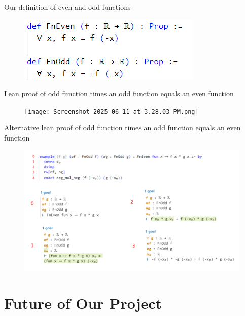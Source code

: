\documentclass[xcolor=dvipsnames]{beamer}
\begin{document}
\begin{frame}{Our definition of even and odd functions}
\begin{figure}
    \centering
    \includegraphics[scale=1]{ev_odd_def.png}
\end{figure}
\end{frame}

\begin{frame}{Lean proof of odd function times an odd function equals an even function}

\begin{figure}
    \centering
    \texttt{[image: Screenshot 2025-06-11 at 3.28.03 PM.png]}
\end{figure}

\end{frame}

\begin{frame}{Alternative lean proof of odd function times an odd function equals an even function}

\begin{figure}
\includegraphics[scale=.32]{alt_ooe_pf.png}
\end{figure}
\end{frame}

\section{Future of Our Project}
\end{document}
